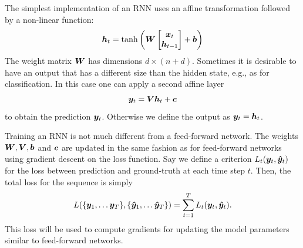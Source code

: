 		The simplest implementation of an RNN uses an affine transformation followed by a non-linear function:
		\begin{equation}
			\bm{h}_t = 
			\tanh \left(
			\bm{W}
			\begin{bmatrix}
				\bm{x}_t \\
				\bm{h}_{t-1}
			\end{bmatrix}
			+ \bm{b}
			\right)
		\end{equation}
		The weight matrix $\bm{W}$ has dimensions $d \times (n + d)$.
		Sometimes it is desirable to have an output that has a different size than the hidden state, e.g., as for classification.
		In this case one can apply a second affine layer
		\begin{equation}
			\bm{y}_t = \bm{V} \bm{h}_t + \bm{c}
		\end{equation}
		to obtain the prediction $\bm{y}_t$.
		Otherwise we define the output as $\bm{y}_t = \bm{h}_t$.
		
		Training an RNN is not much different from a feed-forward network.
		The weights $\bm{W}, \bm{V}, \bm{b}$ and $\bm{c}$ are updated in the same fashion as for feed-forward networks using gradient descent on the loss function.
		Say we define a criterion $L_t(\bm{y}_t, \bm{\hat{y}}_t)$ for the loss between prediction and ground-truth at each time step $t$.
		Then, the total loss for the sequence is simply 
		\begin{equation}\label{eq:loss_for_rnn}
			L(\{\vectr{y}_1, \dots \vectr{y}_T\}, \{\vectr{\hat{y}}_1, \dots \vectr{\hat{y}}_T\}) = \sum_{t=1}^{T} L_t(\vectr{y}_t, \vectr{\hat{y}}_t).
		\end{equation}
		This loss will be used to compute gradients for updating the model parameters similar to feed-forward networks.
		
